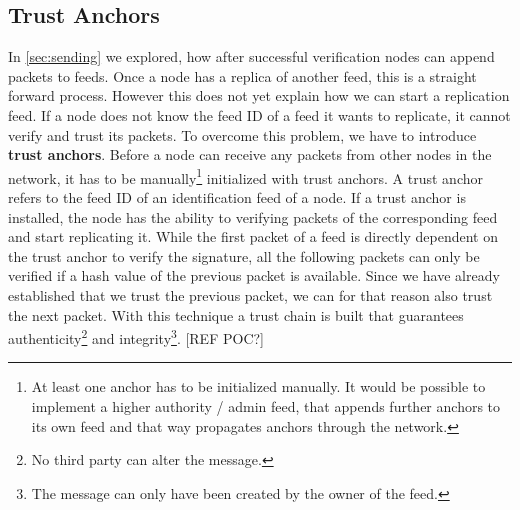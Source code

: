 \subsection{Trust Anchors}
In \cref{sec:sending} we explored, how after successful verification nodes can append packets to feeds. Once a node has a replica of another feed, this is a straight forward process. However this does not yet explain how we can start a replication feed. If a node does not know the feed ID of a feed it wants to replicate, it cannot verify and trust its packets. To overcome this problem, we have to introduce \textbf{trust anchors}. Before a node can receive any packets from other nodes in the network, it has to be manually\footnote{At least one anchor has to be initialized manually. It would be possible to implement a higher authority / admin feed, that appends further anchors to its own feed and that way propagates anchors through the network.} initialized with trust anchors. A trust anchor refers to the feed ID of an identification feed of a node. If a trust anchor is installed, the node has the ability to verifying packets of the corresponding feed and start replicating it. While the first packet of a feed is directly dependent on the trust anchor to verify the signature, all the following packets can only be verified if a hash value of the previous packet is available. Since we have already established that we trust the previous packet, we can for that reason also trust the next packet. With this technique a trust chain is built that guarantees authenticity\footnote{No third party can alter the message.} and integrity\footnote{The message can only have been created by the owner of the feed.}. [REF POC?]

